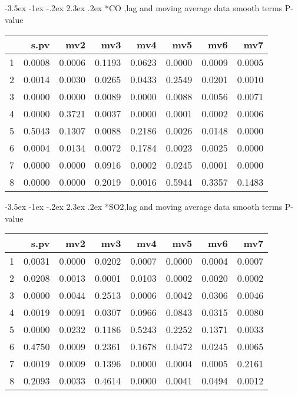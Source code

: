 \documentclass[a4paper, 12pt]{article}
\makeatletter
\def\Large{\fontsize{16}{24}\selectfont}
\renewcommand\section{\@startsection {section}{1}{\z@}%
                                   {-3.5ex \@plus -1ex \@minus -.2ex}%
                                   {2.3ex \@plus.2ex}%
                                   {\centering\normalfont\Large\bfseries}}
\makeatother
\begin{document}
\section*{CO ,lag and moving average data}
smooth terms P-value
\begin{table}[ht]
\centering
\begin{tabular}{rrrrrrrr}
  \hline
 & s.pv & mv2 & mv3 & mv4 & mv5 & mv6 & mv7 \\
  \hline
1 & 0.0008 & 0.0006 & 0.1193 & 0.0623 & 0.0000 & 0.0009 & 0.0005 \\
  2 & 0.0014 & 0.0030 & 0.0265 & 0.0433 & 0.2549 & 0.0201 & 0.0010 \\
  3 & 0.0000 & 0.0000 & 0.0089 & 0.0000 & 0.0088 & 0.0056 & 0.0071 \\
  4 & 0.0000 & 0.3721 & 0.0037 & 0.0000 & 0.0001 & 0.0002 & 0.0006 \\
  5 & 0.5043 & 0.1307 & 0.0088 & 0.2186 & 0.0026 & 0.0148 & 0.0000 \\
  6 & 0.0004 & 0.0134 & 0.0072 & 0.1784 & 0.0023 & 0.0025 & 0.0000 \\
  7 & 0.0000 & 0.0000 & 0.0916 & 0.0002 & 0.0245 & 0.0001 & 0.0000 \\
  8 & 0.0000 & 0.0000 & 0.2019 & 0.0016 & 0.5944 & 0.3357 & 0.1483 \\
   \hline
\end{tabular}
\end{table}
\clearpage
\section*{SO2,lag and moving average data}
smooth terms P-value
\begin{table}[ht]
\centering
\begin{tabular}{rrrrrrrr}
  \hline
 & s.pv & mv2 & mv3 & mv4 & mv5 & mv6 & mv7 \\
  \hline
1 & 0.0031 & 0.0000 & 0.0202 & 0.0007 & 0.0000 & 0.0004 & 0.0007 \\
  2 & 0.0208 & 0.0013 & 0.0001 & 0.0103 & 0.0002 & 0.0020 & 0.0002 \\
  3 & 0.0000 & 0.0044 & 0.2513 & 0.0006 & 0.0042 & 0.0306 & 0.0046 \\
  4 & 0.0019 & 0.0091 & 0.0307 & 0.0966 & 0.0843 & 0.0315 & 0.0080 \\
  5 & 0.0000 & 0.0232 & 0.1186 & 0.5243 & 0.2252 & 0.1371 & 0.0033 \\
  6 & 0.4750 & 0.0009 & 0.2361 & 0.1678 & 0.0472 & 0.0245 & 0.0065 \\
  7 & 0.0019 & 0.0009 & 0.1396 & 0.0000 & 0.0004 & 0.0005 & 0.2161 \\
  8 & 0.2093 & 0.0033 & 0.4614 & 0.0000 & 0.0041 & 0.0494 & 0.0012 \\
   \hline
\end{tabular}
\end{table}
\clearpage
\end{document}
